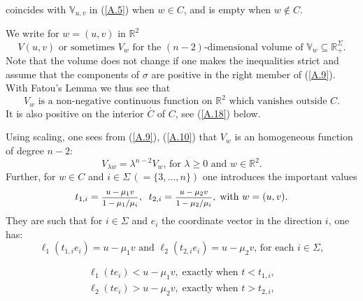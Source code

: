 \documentclass[12pt,leqno]{article}
\def\IR{{\mathbb R}}
\def\IV{{\mathbb V}}
\def\n{\noindent}
\def\dis{\displaystyle}
\def\f{\footnotesize}
\begin{document}
\begin{appendix}
\smallskip\n
coincides with $\IV_{u,v}$ in (\ref{A.5}) when $w \in C$, and is empty when $w \notin C$.

\medskip
We write for $w = (u,v)$ in $\IR^2$
\begin{equation}\label{A.10}
\mbox{$V(u,v)$ or sometimes $V_w$ for the $(n-2)$-dimensional volume of $\IV_w \subseteq \IR_+^\Sigma$}.
\end{equation}
Note that the volume does not change if one makes the inequalities strict and assume that the components of $\sigma$ are positive in the right member of (\ref{A.9}). With Fatou's Lemma we thus see that
\begin{equation}\label{A.11}
\mbox{$V_w$ is a non-negative continuous function on $\IR^2$ which vanishes outside $C$}.
\end{equation}
It is also positive on the interior $\stackrel{_\circ}{C}$ of $C$, see (\ref{A.18}) below. 

\medskip
Using scaling, one sees from (\ref{A.9}), (\ref{A.10}) that $V_w$ is an homogeneous function of degree $n-2$:
\begin{equation}\label{A.12}
\mbox{$V_{\lambda w} = \lambda^{n-2} V_w$, for $\lambda \ge 0$ and $w \in \IR^2$}.
\end{equation}
Further, for $w \in C$ and $i \in \Sigma \,(= \{3, \dots, n\})$ one introduces the important values 
\begin{equation}\label{A.13}
t_{1,i} = \mbox{\f $\dis\frac{u - \mu_1 v}{1 - \mu_1/\mu_i}$}, \;\; t_{2,i} = \mbox{\f $\dis\frac{u - \mu_2 v}{1 - \mu_2/\mu_i}$}, \; \mbox{with $w = (u,v)$}.
\end{equation}
They are such that for $i \in \Sigma$ and $e_i$ the coordinate vector in the direction $i$, one has:
\begin{equation}\label{A.14}
\mbox{$\ell_1(t_{1,i} e_i) = u - \mu_1 v$ and $\ell_2(t_{2,i} e_i) = u - \mu_2 v$, for each $i \in \Sigma$},
\end{equation}

\vspace{-4ex}
\begin{equation}\label{A.15}
\begin{array}{l}
\ell_1(t e_i) < u - \mu_1 v, \; \mbox{exactly when $t < t_{1,i}$},
\\[1ex]
\ell_2(t e_i) > u - \mu_2 v, \; \mbox{exactly when $t > t_{2,i}$},
\end{array}
\end{equation}


\end{appendix}
\end{document}
